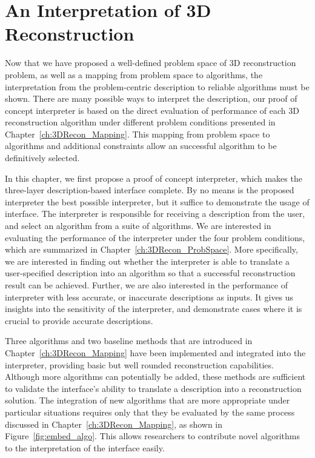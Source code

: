 
\chapter{An Interpretation of 3D Reconstruction}
\label{ch:3DRecon_Interp}
Now that we have proposed a well-defined problem space of 3D reconstruction problem, as well as a mapping from problem space to algorithms, the interpretation from the problem-centric description to reliable algorithms must be shown. There are many possible ways to interpret the description, our proof of concept interpreter is based on the direct evaluation of performance of each 3D reconstruction algorithm under different problem conditions presented in Chapter~\ref{ch:3DRecon_Mapping}. This mapping from problem space to algorithms and additional constraints allow an successful algorithm to be definitively selected.

In this chapter, we first propose a proof of concept interpreter, which makes the three-layer description-based interface complete. By no means is the proposed interpreter the best possible interpreter, but it suffice to demonstrate the usage of interface. The interpreter is responsible for receiving a description from the user, and select an algorithm from a suite of algorithms. We are interested in evaluating the performance of the interpreter under the four problem conditions, which are summarized in Chapter~\ref{ch:3DRecon_ProbSpace}. More specifically, we are interested in finding out whether the interpreter is able to translate a user-specified description into an algorithm so that a successful reconstruction result can be achieved. Further, we are also interested in the performance of interpreter with less accurate, or inaccurate descriptions as inputs. It gives us insights into the sensitivity of the interpreter, and demonstrate cases where it is crucial to provide accurate descriptions.

Three algorithms and two baseline methods that are introduced in Chapter~\ref{ch:3DRecon_Mapping} have been implemented and integrated into the interpreter, providing basic but well rounded reconstruction capabilities. Although more algorithms can potentially be added, these methods are sufficient to validate the interface's ability to translate a description into a reconstruction solution. The integration of new algorithms that are more appropriate under particular situations requires only that they be evaluated by the same process discussed in Chapter~\ref{ch:3DRecon_Mapping}, as shown in Figure~\ref{fig:embed_algo}. This allows researchers to contribute novel algorithms to the interpretation of the interface easily.

